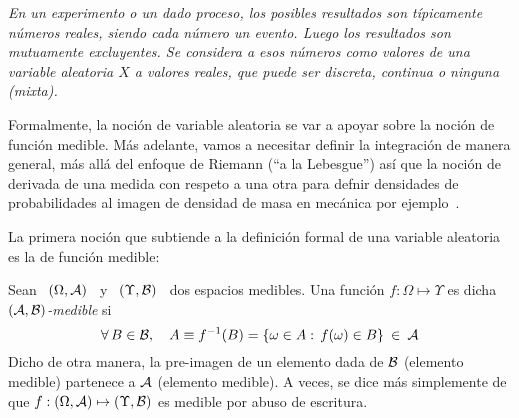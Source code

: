 \label{s:variablealeatoria}

{\it  En  un  experimento  o  un  dado  proceso,  los  posibles  resultados  son
  t\'ipicamente  n\'umeros reales, siendo  cada n\'umero  un evento.   Luego los
  resultados  son mutuamente  excluyentes. Se  considera a  esos  n\'umeros como
  valores de una  \emph{variable aleatoria} $X$ a valores  reales, que puede ser
  discreta, continua o ninguna (mixta).}

Formalmente, la noci\'on de variable aleatoria se var a apoyar sobre la noci\'on
de funci\'on medible. M\'as adelante, vamos a necesitar definir la integraci\'on
de manera general, m\'as all\'a del enfoque de Riemann (``a la Lebesgue'') as\'i
que la  noci\'on de derivada de  una medida con  respeto a una otra  para defnir
densidades de  probabilidades al  imagen de densidad  de masa en  mec\'anica por
ejemplo~\cite{Leb04, Leb18, KolFom61, AthLah06, Bog07:v1, Coh13}.



\label{sec:MP:VAPreliminaria}

La  primera noci\'on  que subtiende  a la  definici\'on formal  de  una variable
aleatoria es la de funci\'on medible:

\begin{definicion}
  Sean  \ $(\Omega,\mathcal{A})$  \ y  \ $(\Upsilon,\mathcal{B})$  \ dos  espacios  medibles.  Una
  funci\'on $f: \Omega \mapsto \Upsilon$ es dicha {\it $(\mathcal{A},\mathcal{B})$-medible} si
  \[
  \forall \,  B \in  \mathcal{B}, \quad  A \equiv f^{-1}(B)  = \left\{  \omega \in  A: \,
    f(\omega) \in B \right\} \: \in \: \mathcal{A}
  \]
  Dicho de  otra manera,  la pre-imagen  de un elemento  dada de  $\mathcal{B}$ (elemento
  medible)  partenece  a  $\mathcal{A}$  (elemento  medible).  A  veces,  se  dice  m\'as
  simplemente de que $f: (\Omega,\mathcal{A}) \mapsto (\Upsilon,\mathcal{B})$ es medible por abuso
  de escritura.
\end{definicion}


